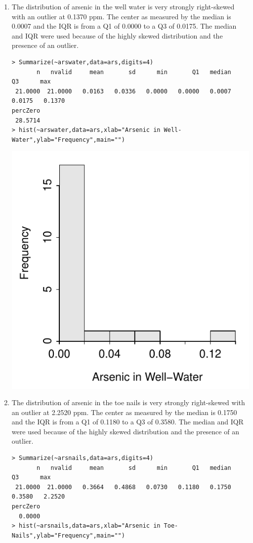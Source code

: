 \documentclass[10pt,openany]{book}\usepackage[]{graphicx}\usepackage[]{color}
\makeatletter
\newenvironment{kframe}{%
 \def\at@end@of@kframe{}%
 \ifinner\ifhmode%
  \def\at@end@of@kframe{\end{minipage}}%
  \begin{minipage}{\columnwidth}%
 \fi\fi%
 \def\FrameCommand##1{\hskip\@totalleftmargin \hskip-\fboxsep
 \colorbox{shadecolor}{##1}\hskip-\fboxsep
     \hskip-\linewidth \hskip-\@totalleftmargin \hskip\columnwidth}%
 \MakeFramed {\advance\hsize-\width
   \@totalleftmargin\z@ \linewidth\hsize
   \@setminipage}}%
 {\par\unskip\endMakeFramed%
 \at@end@of@kframe}
\newenvironment{knitrout}{}{} %
\makeatother
\begin{document}
\begin{itemize}
    \begin{enumerate}
      \item The distribution of arsenic in the well water is very strongly right-skewed with an outlier at 0.1370 ppm.  The center as measured by the median is 0.0007 and the IQR is from a Q1 of 0.0000 to a Q3 of 0.0175.  The median and IQR were used because of the highly skewed distribution and the presence of an outlier.
\begin{knitrout}
\color{fgcolor}\begin{kframe}
\begin{verbatim}
> Summarize(~arswater,data=ars,digits=4)
       n   nvalid     mean       sd      min       Q1   median       Q3      max 
 21.0000  21.0000   0.0163   0.0336   0.0000   0.0000   0.0007   0.0175   0.1370 
percZero 
 28.5714 
> hist(~arswater,data=ars,xlab="Arsenic in Well-Water",ylab="Frequency",main="")
\end{verbatim}
\end{kframe}

{\centering \includegraphics[width=.4\linewidth]{Figs/ArsHist1-1} 

}



\end{knitrout}


      \item The distribution of arsenic in the toe nails is very strongly right-skewed with an outlier at 2.2520 ppm.  The center as measured by the median is 0.1750 and the IQR is from a Q1 of 0.1180 to a Q3 of 0.3580.  The median and IQR were used because of the highly skewed distribution and the presence of an outlier.
\begin{knitrout}
\color{fgcolor}\begin{kframe}
\begin{verbatim}
> Summarize(~arsnails,data=ars,digits=4)
       n   nvalid     mean       sd      min       Q1   median       Q3      max 
 21.0000  21.0000   0.3664   0.4868   0.0730   0.1180   0.1750   0.3580   2.2520 
percZero 
  0.0000 
> hist(~arsnails,data=ars,xlab="Arsenic in Toe-Nails",ylab="Frequency",main="")
\end{verbatim}
\end{kframe}


\end{knitrout}
\end{enumerate}
\end{itemize}
\end{document}
